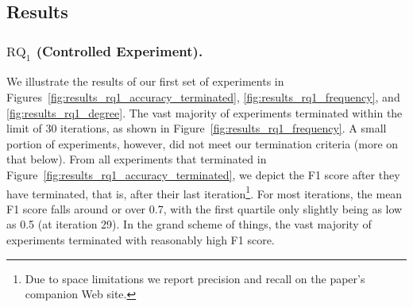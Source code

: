 \documentclass[sigconf]{acmart}
\begin{document}
	\subsection{Results}	
	\subsubsection{$\text{RQ}_1$ (Controlled Experiment).}
	We illustrate the results of our first set of experiments in Figures~\ref{fig:results_rq1_accuracy_terminated}, \ref{fig:results_rq1_frequency}, and \ref{fig:results_rq1_degree}. The vast majority of experiments terminated within the limit of 30 iterations, as shown in Figure~\ref{fig:results_rq1_frequency}. A small portion of experiments, however, did not meet our termination criteria (more on that below). From all experiments that terminated in Figure~\ref{fig:results_rq1_accuracy_terminated}, we depict the F1 score after they have terminated, that is, after their last iteration\footnote{Due to space limitations we report precision and recall on the paper's companion Web site.}. For most iterations, the mean F1 score falls around or over 0.7, with the first quartile  only slightly being as low as 0.5 (at iteration 29).  In the grand scheme of things, the vast majority of experiments terminated with reasonably high F1 score. 
\end{document}
